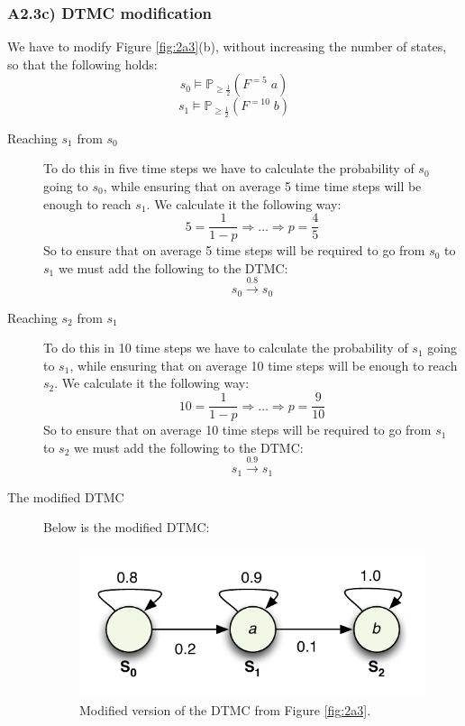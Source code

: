 \documentclass[12pt]{report}
\begin{document}

\subsubsection*{A2.3c) DTMC modification}
We have to modify Figure \ref{fig:2a3}(b), without increasing the number of states, so that the following holds:
$$s_0 \models \mathbb{P}_{\geq \frac{1}{2}}(F^{=5}\; a)$$
$$s_1 \models \mathbb{P}_{\geq \frac{1}{2}}(F^{=10}\; b)$$

\begin{description}
	\item[Reaching $s_1$ from $s_0$] To do this in five time steps we have to calculate the probability of $s_0$ going to $s_0$, while ensuring that on average 5 time time steps will be enough to reach $s_1$. We calculate it the following way:
	$$5 = \frac{1}{1-p} \Rightarrow \ldots \Rightarrow p = \frac{4}{5}$$
	So to ensure that on average 5 time steps will be required to go from $s_0$ to $s_1$ we must add the following to the DTMC:
	$$s_0 \xrightarrow{0.8} s_0$$
	
	\item[Reaching $s_2$ from $s_1$] To do this in 10 time steps we have to calculate the probability of $s_1$ going to $s_1$, while ensuring that on average 10 time steps will be enough to reach $s_2$. We calculate it the following way:
	$$10 = \frac{1}{1-p} \Rightarrow \ldots \Rightarrow p = \frac{9}{10}$$
	So to ensure that on average 10 time steps will be required to go from $s_1$ to $s_2$ we must add the following to the DTMC:
	$$s_1 \xrightarrow{0.9} s_1$$
	
	\item[The modified DTMC] Below is the modified DTMC:
	\begin{figure}[H]
		\begin{center}
		\includegraphics[scale=.85]{../GFX/Answer-A2-3c.pdf}
		\end{center}
		\caption{Modified version of the DTMC from Figure \ref{fig:2a3}.}
	\end{figure}
\end{description}
\end{document}
